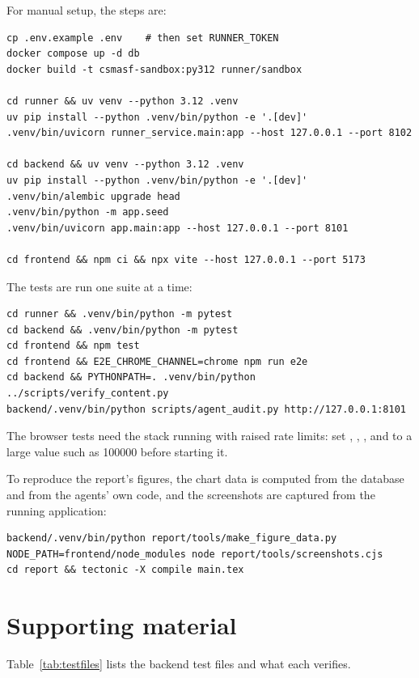 For manual setup, the steps are:
{\small\begin{verbatim}
cp .env.example .env    # then set RUNNER_TOKEN
docker compose up -d db
docker build -t csmasf-sandbox:py312 runner/sandbox

cd runner && uv venv --python 3.12 .venv
uv pip install --python .venv/bin/python -e '.[dev]'
.venv/bin/uvicorn runner_service.main:app --host 127.0.0.1 --port 8102

cd backend && uv venv --python 3.12 .venv
uv pip install --python .venv/bin/python -e '.[dev]'
.venv/bin/alembic upgrade head
.venv/bin/python -m app.seed
.venv/bin/uvicorn app.main:app --host 127.0.0.1 --port 8101

cd frontend && npm ci && npx vite --host 127.0.0.1 --port 5173
\end{verbatim}}

The tests are run one suite at a time:
{\small\begin{verbatim}
cd runner && .venv/bin/python -m pytest
cd backend && .venv/bin/python -m pytest
cd frontend && npm test
cd frontend && E2E_CHROME_CHANNEL=chrome npm run e2e
cd backend && PYTHONPATH=. .venv/bin/python ../scripts/verify_content.py
backend/.venv/bin/python scripts/agent_audit.py http://127.0.0.1:8101
\end{verbatim}}
The browser tests need the stack running with raised rate limits: set , , ,  and  to a large value such as 100000 before starting it.

To reproduce the report's figures, the chart data is computed from the database and from the agents' own code, and the screenshots are captured from the running application:
{\small\begin{verbatim}
backend/.venv/bin/python report/tools/make_figure_data.py
NODE_PATH=frontend/node_modules node report/tools/screenshots.cjs
cd report && tectonic -X compile main.tex
\end{verbatim}}

\section{Supporting material}
Table~\ref{tab:testfiles} lists the backend test files and what each verifies.

